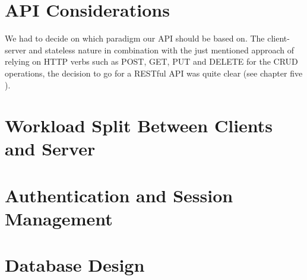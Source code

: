 \vspace{0.5cm}

\section{API Considerations}

We had to decide on which paradigm our API should be based on. The client-server and stateless nature in combination with the just mentioned approach of relying on HTTP verbs such as POST, GET, PUT and DELETE for the CRUD operations, the decision to go for a RESTful API was quite clear (see chapter five \cite{fielding2000architectural}).


\vspace{0.5cm}

\section{Workload Split Between Clients and Server}


\vspace{0.5cm}

\section{Authentication and Session Management}


\vspace{0.5cm}

\section{Database Design}